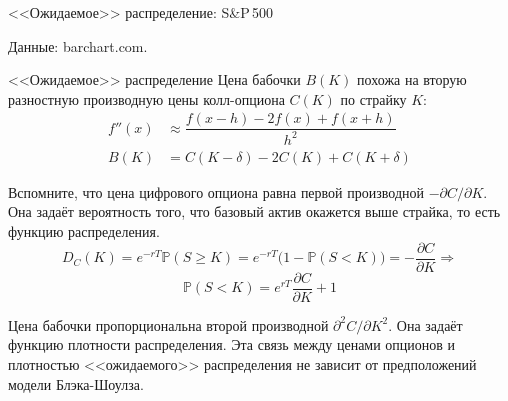 \documentclass{beamer}
\begin{document}
\begin{frame}{<<Ожидаемое>> распределение: S\&P\,500}
\centering
{}

\scriptsize Данные: barchart.com.
\end{frame}



\begin{frame}{<<Ожидаемое>> распределение}
\justify
Цена бабочки $B(K)$ похожа на вторую разностную производную цены колл-опциона $C(K)$ по страйку $K$:
\begin{align*}
f''(x) &\approx \dfrac{f(x - h) - 2f(x) + f(x+h)}{h^2} \\
B(K) &= C(K-\delta) - 2C(K) + C(K+\delta)
\end{align*}

\justify
Вспомните, что цена цифрового опциона равна первой производной $-\partial C/\partial K$. Она задаёт вероятность того, что базовый актив окажется выше страйка, то есть \alert{функцию распределения}.
\begin{equation*}
D_C(K) = e^{-rT}\mathbb{P}(S \ge K) = e^{-rT}\Big(1 - \mathbb{P}(S < K)\Big) = -\dfrac{\partial C}{\partial K} \Rightarrow
\end{equation*}
\begin{equation*}
\mathbb{P}(S < K) = e^{rT}\dfrac{\partial C}{\partial K} + 1
\end{equation*}

\justify
Цена бабочки пропорциональна второй производной $\partial^2C/\partial K^2$. Она задаёт \alert{функцию плотности распределения}. Эта связь между ценами опционов и плотностью <<ожидаемого>> распределения не зависит от предположений модели Блэка-Шоулза.
\end{frame}
\end{document}
